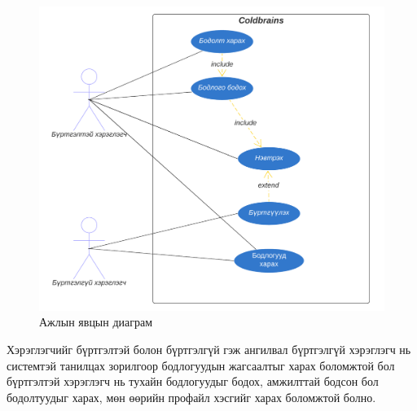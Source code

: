\begin{figure}[h]
  \centering
  \includegraphics{img/diagrams/coldbrains-use-case.png}
  \caption{Ажлын явцын диаграм}
\end{figure}

Хэрэглэгчийг бүртгэлтэй болон бүртгэлгүй гэж ангилвал бүртгэлгүй хэрэглэгч нь системтэй танилцах зорилгоор бодлогуудын жагсаалтыг харах боломжтой бол бүртгэлтэй хэрэглэгч нь тухайн бодлогуудыг бодох, амжилттай бодсон бол бодолтуудыг харах, мөн өөрийн профайл хэсгийг харах боломжтой болно.

\clearpage


